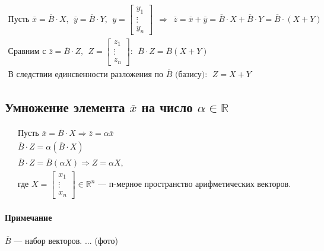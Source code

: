 \documentclass{article}
\begin{document}
\begin{gather*}
    \text{Пусть } \overline{x} = \overline{B} \cdot X, ~~\overline{y} = \overline{B} \cdot Y, ~~ y = \begin{bmatrix}
        y_1    \\
        \vdots \\
        y_n
    \end{bmatrix} ~~\Rightarrow~~
\overline{z} = \overline{x} + \overline{y} = \overline{B} \cdot X + \overline{B} \cdot Y = \overline{B} \cdot (X + Y) \\
    \text{Сравним с } \overline{z} = \overline{B} \cdot Z, ~~ Z = \begin{bmatrix}
        z_1    \\
        \vdots \\
        z_n
    \end{bmatrix}: ~~\overline{B} \cdot Z = \overline{B} (X + Y) \\
    \text{В следствии единсвенности разложения по } \overline{B} \text{ (базису)}: ~~\boxed{Z = X + Y}
\end{gather*}


\subsection{Умножение элемента $\overline{x}$ на число $\alpha \in \mathbb{R}$}
\begin{gather*}
    \text{Пусть } \overline{x} = \overline{B} \cdot X \Rightarrow \overline{z} = \alpha \overline{x} \\
    \overline{B} \cdot Z = \alpha (\overline{B} \cdot X) \\
    \overline{B} \cdot Z = \overline{B} (\alpha X) \Rightarrow \boxed{Z = \alpha X}, \\
    \text{где } X = \begin{bmatrix}
        x_1   \\
        \vdots \\
        x_n
    \end{bmatrix} \in \mathbb{R}^n \text{ --- п-мерное пространство арифметических векторов.}
\end{gather*}
\paragraph{Примечание}
$\overline{B}$ --- набор векторов.
... (фото)
\end{document}
